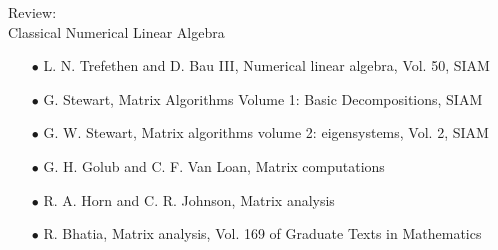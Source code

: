 \documentclass{beamer}
\begin{document}
\begin{frame}{}
\vspace{2.5cm}
\begin{center}
\begin{Large}
    Review:\\
    Classical Numerical Linear Algebra
\end{Large}
\end{center}
\vspace{1.5cm} 
\begin{footnotesize}
\begin{itemize}
    \item[$\bullet$] L. N. Trefethen and D. Bau III, Numerical linear algebra, Vol. 50, SIAM
    \item[$\bullet$] G. Stewart, Matrix Algorithms Volume 1: Basic Decompositions, SIAM
    \item[$\bullet$] G. W. Stewart, Matrix algorithms volume 2: eigensystems, Vol. 2, SIAM
    \item[$\bullet$] G. H. Golub and C. F. Van Loan, Matrix computations
    \item[$\bullet$] R. A. Horn and C. R. Johnson, Matrix analysis
    \item[$\bullet$] R. Bhatia, Matrix analysis, Vol. 169 of Graduate Texts in Mathematics
\end{itemize}
\end{footnotesize}

\end{frame}
\end{document}
